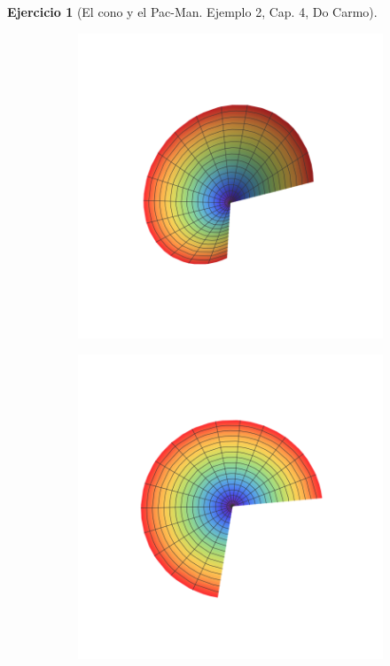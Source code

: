 \documentclass[spanish]{book}
\theoremstyle{definition}
\newtheorem*{ejer}{Ejercicio}
\begin{document}
\begin{ejer}[El cono y el Pac-Man. Ejemplo 2, Cap. 4, Do Carmo]
\begin{figure}[H]
\begin{subfigure}{.3\textwidth}
		\end{subfigure}	\hspace{-1.2cm}
		\begin{subfigure}{.3\textwidth}
			\centering
			\includegraphics[width=\linewidth]{sup19}
		\end{subfigure}	\hspace{-1cm}
		\begin{subfigure}{.3\textwidth}
			\centering
			\includegraphics[width=\linewidth]{sup20}
		\end{subfigure}
	\end{figure}
\end{ejer}
\end{document}
